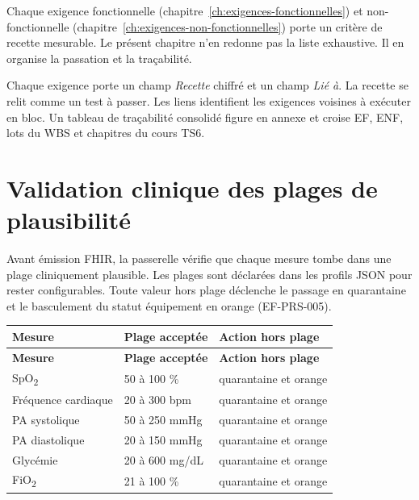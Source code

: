 Chaque exigence fonctionnelle (chapitre~\ref{ch:exigences-fonctionnelles}) et non-fonctionnelle (chapitre~\ref{ch:exigences-non-fonctionnelles}) porte un critère de recette mesurable. Le présent chapitre n'en redonne pas la liste exhaustive. Il en organise la passation et la traçabilité.

\begin{bridgeinfo}[Traçabilité]
Chaque exigence porte un champ \emph{Recette} chiffré et un champ \emph{Lié à}. La recette se relit comme un test à passer. Les liens identifient les exigences voisines à exécuter en bloc. Un tableau de traçabilité consolidé figure en annexe et croise EF, ENF, lots du WBS et chapitres du cours TS6.
\end{bridgeinfo}

\section{Validation clinique des plages de plausibilité}
\label{sec:plausibilite}

Avant émission FHIR, la passerelle vérifie que chaque mesure tombe dans une plage cliniquement plausible. Les plages sont déclarées dans les profils JSON pour rester configurables. Toute valeur hors plage déclenche le passage en quarantaine et le basculement du statut équipement en orange (EF-PRS-005).

\bridgezebra
\begin{longtable}{p{4cm}p{4cm}p{4cm}}
  \toprule
  \rowcolor{bridgeblue!90}
  {\color{white}\bfseries Mesure} & {\color{white}\bfseries Plage acceptée} & {\color{white}\bfseries Action hors plage} \\
  \midrule
  \endfirsthead
  \toprule
  \rowcolor{bridgeblue!90}
  {\color{white}\bfseries Mesure} & {\color{white}\bfseries Plage acceptée} & {\color{white}\bfseries Action hors plage} \\
  \midrule
  \endhead
  \bottomrule
  \endfoot
  SpO\textsubscript{2}     & 50 à 100 \%        & quarantaine et orange \\
  Fréquence cardiaque      & 20 à 300 bpm       & quarantaine et orange \\
  PA systolique            & 50 à 250 mmHg      & quarantaine et orange \\
  PA diastolique           & 20 à 150 mmHg      & quarantaine et orange \\
  Glycémie                 & 20 à 600 mg/dL     & quarantaine et orange \\
  FiO\textsubscript{2}     & 21 à 100 \%        & quarantaine et orange \\
\end{longtable}

